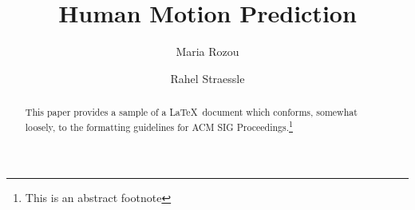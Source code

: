 \documentclass[sigconf]{acmart}
\begin{document}
\title{Human Motion Prediction}

\author{Maria Rozou}\affiliation{}

\author{Rahel Straessle}\affiliation{}

\begin{abstract}
This paper provides a sample of a \LaTeX\ document which conforms,
somewhat loosely, to the formatting guidelines for
ACM SIG Proceedings.\footnote{This is an abstract footnote}
\end{abstract}

\maketitle





\end{document}
